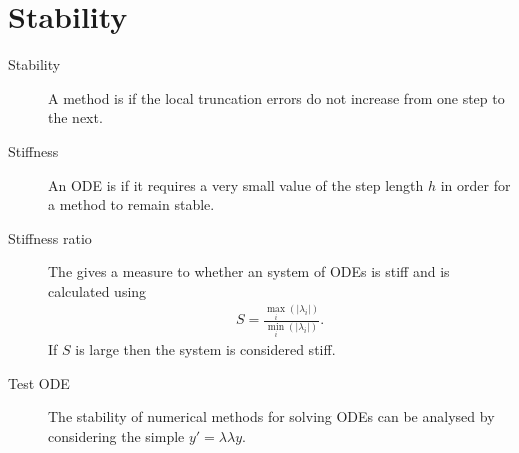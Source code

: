 \documentclass[letterpaper,10pt,english]{jupyterBook}
\begin{document}
\section{Stability}
\label{\detokenize{8_Appendices/8.0_Cheat_sheet:stability}}\begin{description}
\item[{Stability\label{\detokenize{8_Appendices/8.0_Cheat_sheet:term-Stability}}}] \leavevmode
\sphinxAtStartPar
A method is {\hyperref[\detokenize{4_Stability/4.0_Stability:stability-definition}]{}} if the local truncation errors do not increase from one step to the next.

\item[{Stiffness\label{\detokenize{8_Appendices/8.0_Cheat_sheet:term-Stiffness}}}] \leavevmode
\sphinxAtStartPar
An ODE is {\hyperref[\detokenize{4_Stability/4.0_Stability:stiffness-section}]{}} if it requires a very small value of the step length \(h\) in order for a method to remain stable.

\item[{Stiffness ratio\label{\detokenize{8_Appendices/8.0_Cheat_sheet:term-Stiffness-ratio}}}] \leavevmode
\sphinxAtStartPar
The {\hyperref[\detokenize{4_Stability/4.0_Stability:stiffness-ratio-definition}]{}} gives a measure to whether an system of ODEs is stiff and is calculated using
\begin{align*}
    S = \frac{\max_i(|\lambda_i|)}{\min_i(|\lambda_i|)}.
\end{align*}
\sphinxAtStartPar
If \(S\) is large then the system is considered stiff.

\item[{Test ODE\label{\detokenize{8_Appendices/8.0_Cheat_sheet:term-Test-ODE}}}] \leavevmode
\sphinxAtStartPar
The stability of numerical methods for solving ODEs can be analysed by considering the simple {\hyperref[\detokenize{4_Stability/4.1_Stability_functions:stability-functions-section}]{}} \(y' = \lambda \lambda y\).


\end{description}
\end{document}
